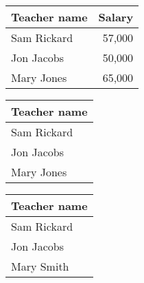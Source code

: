 \begin{figure}
    \begin{minipage}{0.33333333\linewidth}
        \centering
        \begin{tabular}{lr}
            Teacher name & Salary \\
            \hline
            Sam Rickard & 57,000 \\
            Jon Jacobs & 50,000 \\
            Mary Jones & 65,000 \\
        \end{tabular}
        \label{fig:school-salaries-hr}
    \end{minipage}%
    \begin{minipage}{0.33333333\linewidth}
        \centering
        \begin{tabular}{l}
            Teacher name \\
            \hline
            Sam Rickard \\
            Jon Jacobs \\
            Mary Jones \\
        \end{tabular}
        \label{fig:school-salaries-sec-pre}
    \end{minipage}%
    \begin{minipage}{0.33333333\linewidth}
        \centering
        \begin{tabular}{l}
            Teacher name \\
            \hline
            Sam Rickard \\
            Jon Jacobs \\
            Mary Smith \\
        \end{tabular}
        \label{fig:school-salaries-sec-post}
    \end{minipage}\\[3ex]


\end{figure}
